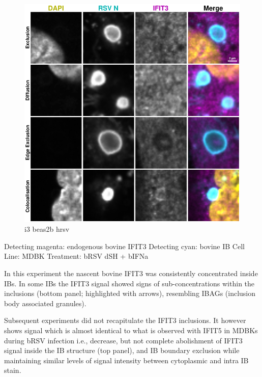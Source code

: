 \begin{figure}
    \centering
    \includegraphics[width=1\linewidth]{09. Chapter 4/Figs/02. Infection/05. beas2b i3.pdf}
    \caption[i3 beas2b hrsv]{i3 beas2b hrsv}
    \label{fig:i3 beas2b hrsv}
\end{figure}

Detecting magenta: endogenous bovine IFIT3 \newline
Detecting cyan: bovine IB \newline
Cell Line: MDBK \newline
Treatment: bRSV dSH + bIFNa \newline

In this experiment the nascent bovine IFIT3 was consistently concentrated inside IBs. In some IBs the IFIT3 signal showed signs of sub-concentrations within the inclusions (bottom panel; highlighted with arrows), resembling IBAGs (inclusion body associated granules).

Subsequent experiments did not recapitulate the IFIT3 inclusions. It however shows signal which is almost identical to what is observed with IFIT5 in MDBKs during bRSV infection i.e., decrease, but not complete abolishment of IFIT3 signal inside the IB structure (top panel), and IB boundary exclusion while maintaining similar levels of signal intensity between cytoplasmic and intra IB stain.

